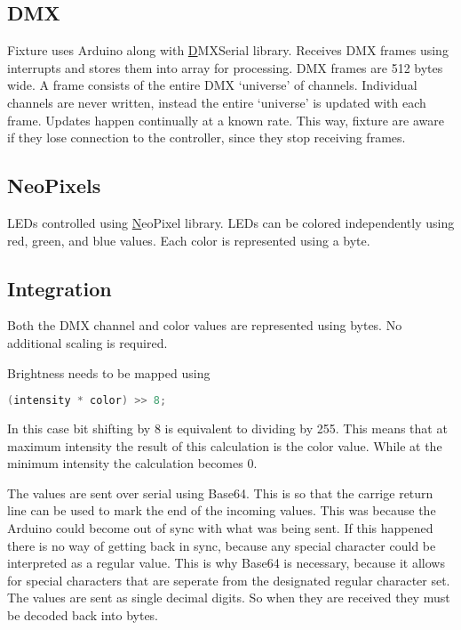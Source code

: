 \subsection{DMX}
Fixture uses Arduino along with
\href{https://github.com/mathertel/DMXSerial}DMXSerial library.
Receives DMX frames using interrupts
and stores them into array for processing.
DMX frames are 512 bytes wide.
A frame consists of the entire DMX `universe' of channels.
Individual channels are never written,
instead the entire `universe' is updated with each frame.
Updates happen continually at a known rate.
This way, fixture are aware if they lose connection to the controller,
since they stop receiving frames.

\subsection{NeoPixels}
LEDs controlled using \href{https://github.com/adafruit/Adafruit_NeoPixel}NeoPixel library.
LEDs can be colored independently using red, green, and blue values.
Each color is represented using a byte.

\subsection{Integration}
Both the DMX channel and color values are represented using bytes.
No additional scaling is required.

Brightness needs to be mapped using
\begin{lstlisting}[language=C]
  (intensity * color) >> 8;
\end{lstlisting}

In this case bit shifting by 8 is equivalent to dividing by 255.
This means that at maximum intensity the result of this calculation is the color value.
While at the minimum intensity the calculation becomes 0.

The values are sent over serial using Base64.
This is so that the carrige return line can be used to mark the end of the incoming values.
This was because the Arduino could become out of sync with what was being sent.
If this happened there is no way of getting back in sync,
because any special character could be interpreted as a regular value.
This is why Base64 is necessary, because it allows for special characters that are seperate
from the designated regular character set.
The values are sent as single decimal digits.
So when they are received they must be decoded back into bytes.

